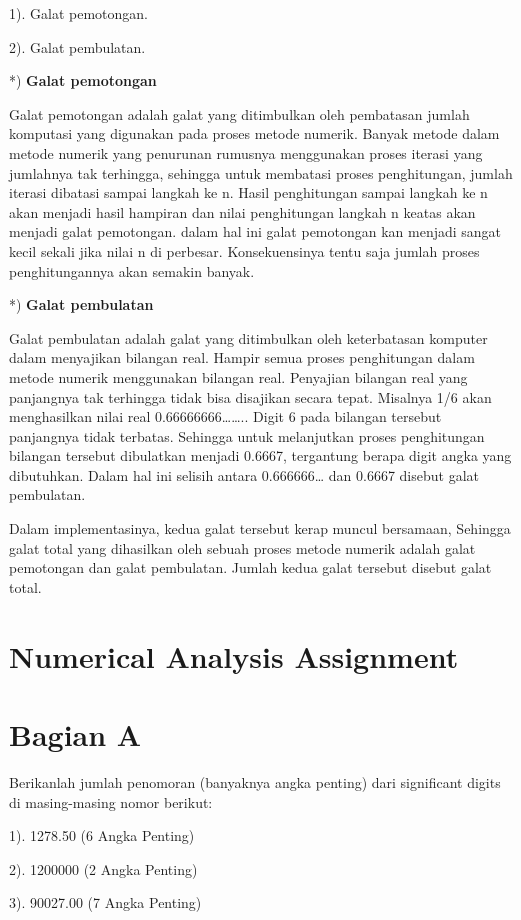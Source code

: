 \documentclass{article}
\begin{document}
1). Galat pemotongan.

2). Galat pembulatan.

*) \textbf{Galat pemotongan}

Galat pemotongan adalah galat yang ditimbulkan oleh pembatasan jumlah komputasi yang digunakan pada proses metode numerik. Banyak metode dalam metode numerik yang penurunan rumusnya menggunakan proses iterasi yang  jumlahnya tak terhingga, sehingga untuk membatasi proses penghitungan, jumlah iterasi dibatasi sampai langkah ke n. Hasil penghitungan sampai langkah ke n akan menjadi hasil hampiran dan nilai penghitungan langkah n keatas akan menjadi galat pemotongan. dalam hal ini galat pemotongan kan menjadi sangat kecil sekali jika nilai n di perbesar. Konsekuensinya tentu saja jumlah proses penghitungannya akan semakin banyak.

*) \textbf{Galat pembulatan}

Galat pembulatan adalah galat yang ditimbulkan oleh keterbatasan komputer dalam menyajikan bilangan real. Hampir semua proses penghitungan dalam metode numerik menggunakan bilangan real. Penyajian bilangan real yang panjangnya tak terhingga tidak bisa disajikan secara tepat. Misalnya 1/6 akan menghasilkan nilai real 0.66666666…….. Digit 6 pada bilangan tersebut panjangnya tidak terbatas. Sehingga untuk melanjutkan proses penghitungan bilangan tersebut dibulatkan menjadi 0.6667, tergantung berapa digit angka yang dibutuhkan. Dalam hal ini selisih antara 0.666666… dan 0.6667 disebut galat pembulatan. 

Dalam implementasinya, kedua galat tersebut kerap muncul bersamaan, Sehingga galat total yang dihasilkan oleh sebuah proses metode numerik adalah galat pemotongan dan galat pembulatan. Jumlah kedua galat tersebut disebut galat total.

\section*{Numerical Analysis Assignment}

\section*{Bagian A}
Berikanlah jumlah penomoran (banyaknya angka penting) dari significant digits di masing-masing nomor berikut:

1). 1278.50 (6 Angka Penting)

2). 1200000 (2 Angka Penting)

3). 90027.00 (7 Angka Penting) 
\end{document}
